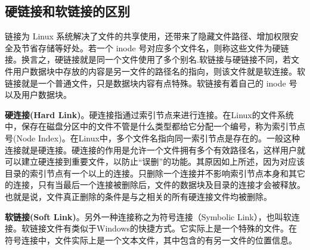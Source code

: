 \documentclass[../../../interview-questions.tex]{subfiles}
\begin{document}
\subsection{硬链接和软链接的区别}

链接为 Linux 系统解决了文件的共享使用，还带来了隐藏文件路径、增加权限安全及节省存储等好处。若一个 inode 号对应多个文件名，则称这些文件为硬链接。换言之，硬链接就是同一个文件使用了多个别名.软链接与硬链接不同，若文件用户数据块中存放的内容是另一文件的路径名的指向，则该文件就是软连接。软链接就是一个普通文件，只是数据块内容有点特殊。软链接有着自己的 inode 号以及用户数据块。

\textbf{硬连接(Hard Link)}。硬连接指通过索引节点来进行连接。在Linux的文件系统中，保存在磁盘分区中的文件不管是什么类型都给它分配一个编号，称为索引节点号(Node Index)。在Linux中，多个文件名指向同一索引节点是存在的。一般这种连接就是硬连接。硬连接的作用是允许一个文件拥有多个有效路径名，这样用户就可以建立硬连接到重要文件，以防止“误删”的功能。其原因如上所述，因为对应该目录的索引节点有一个以上的连接。只删除一个连接并不影响索引节点本身和其它的连接，只有当最后一个连接被删除后，文件的数据块及目录的连接才会被释放。也就是说，文件真正删除的条件是与之相关的所有硬连接文件均被删除。

\textbf{软链接(Soft Link)}。另外一种连接称之为符号连接（Symbolic Link），也叫软连接。软链接文件有类似于Windows的快捷方式。它实际上是一个特殊的文件。在符号连接中，文件实际上是一个文本文件，其中包含的有另一文件的位置信息。
\end{document}

